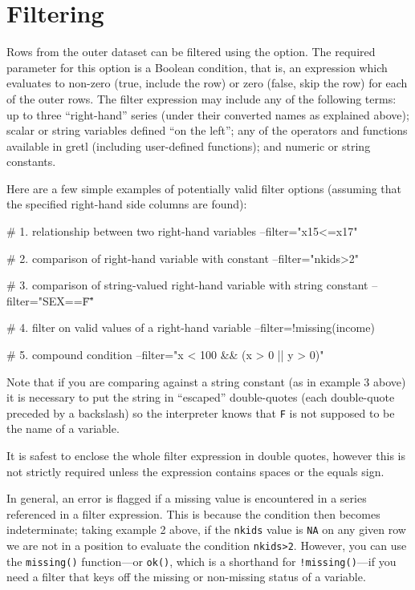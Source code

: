 \section{Filtering}
\label{sec:join-filter}

Rows from the outer dataset can be filtered using the 
option. The required parameter for this option is a Boolean condition,
that is, an expression which evaluates to non-zero (true, include the
row) or zero (false, skip the row) for each of the outer rows. The
filter expression may include any of the following terms: up to three
``right-hand'' series (under their converted names as explained
above); scalar or string variables defined ``on the left''; any of the
operators and functions available in gretl (including user-defined
functions); and numeric or string constants.

Here are a few simple examples of potentially valid filter options
(assuming that the specified right-hand side columns are found):

\begin{code}
# 1. relationship between two right-hand variables
--filter="x15<=x17"

# 2. comparison of right-hand variable with constant
--filter="nkids>2"

# 3. comparison of string-valued right-hand variable with string constant
--filter="SEX==\"F\""

# 4. filter on valid values of a right-hand variable
--filter=!missing(income)

# 5. compound condition
--filter="x < 100 && (x > 0 || y > 0)"
\end{code}

Note that if you are comparing against a string constant (as in
example 3 above) it is necessary to put the string in ``escaped''
double-quotes (each double-quote preceded by a backslash) so the
interpreter knows that \texttt{F} is not supposed to be the name of a
variable.

It is safest to enclose the whole filter expression in double quotes,
however this is not strictly required unless the expression contains
spaces or the equals sign.

In general, an error is flagged if a missing value is encountered in
a series referenced in a filter expression. This is because the
condition then becomes indeterminate; taking example 2 above, if the
\texttt{nkids} value is \texttt{NA} on any given row we are not in a
position to evaluate the condition \texttt{nkids>2}. However, you can
use the \texttt{missing()} function---or \texttt{ok()}, which is a
shorthand for \texttt{!missing()}---if you need a filter that keys off
the missing or non-missing status of a variable.


